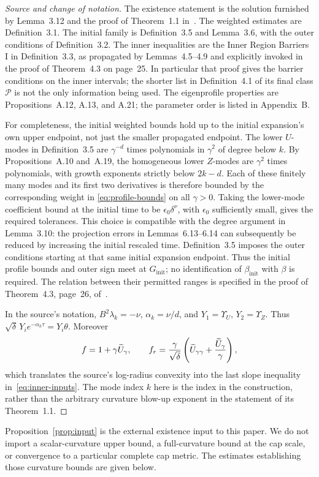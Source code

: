 \begin{proof}[Source and change of notation]
The existence statement is the solution furnished by Lemma~3.12 and the
proof of Theorem~1.1 in~\cite{Stolarski2019}. The weighted estimates are
Definition~3.1. The initial family is Definition~3.5 and Lemma~3.6,
with the outer conditions of Definition~3.2.
The inner inequalities are the Inner Region Barriers I in Definition~3.3,
as propagated by Lemmas~4.5--4.9 and explicitly invoked in the proof of
Theorem~4.3 on page~25. In particular that proof gives the barrier
conditions on the inner intervals; the shorter list in Definition~4.1
of its final class \(\mathcal P\) is not the only information being used.
The eigenprofile properties are Propositions~A.12, A.13, and A.21;
the parameter order is listed in Appendix~B.

For completeness, the initial weighted bounds hold up to the initial
expansion's own upper endpoint, not just the smaller propagated endpoint.
The lower \(U\)-modes in Definition~3.5 are \(\gamma^{-d}\) times
polynomials in \(\gamma^2\) of degree below \(k\).
By Propositions~A.10 and~A.19, the homogeneous lower \(Z\)-modes are
\(\gamma^2\) times polynomials, with growth exponents strictly below
\(2k-d\). Each of these finitely many modes and its first two
derivatives is therefore bounded by the corresponding weight in
\eqref{eq:profile-bounds} on all \(\gamma>0\).
Taking the lower-mode coefficient bound at the initial time to be
\(\epsilon_0\delta^\nu\), with \(\epsilon_0\) sufficiently small,
gives the required tolerances. This choice is compatible with the degree
argument in Lemma~3.10: the projection errors in Lemmas~6.13--6.14 can
subsequently be reduced by increasing the initial rescaled time.
Definition~3.5 imposes the outer conditions starting at that same initial
expansion endpoint. Thus the initial profile bounds and outer sign meet
at \(G_{\mathrm{init}}\); no identification of
\(\beta_{\mathrm{init}}\) with \(\beta\) is required.
The relation between their permitted ranges is specified in the proof
of Theorem~4.3, page~26, of~\cite{Stolarski2019}.

In the source's notation,
\(B^2\lambda_k=-\nu\), \(\alpha_k=\nu/d\), and
\(Y_1=\Upsilon_U\), \(Y_2=\Upsilon_Z\).
Thus \(\sqrt\delta\,Y_i e^{-\alpha_k\tau}=Y_i\theta\).
Moreover
\[
f=1+\gamma\widetilde U_\gamma,\qquad
f_r=\frac{\gamma}{\sqrt\delta}
   \left(\widetilde U_{\gamma\gamma}+\frac{\widetilde U_\gamma}{\gamma}\right),
\]
which translates the source's log-radius convexity into the last slope
inequality in~\eqref{eq:inner-inputs}.
The mode index \(k\) here is the index in the construction, rather than
the arbitrary curvature blow-up exponent in the statement of its
Theorem~1.1.
\end{proof}

\begin{remark}\label{rem:input-scope}
Proposition~\ref{prop:input} is the external existence input to this paper.
We do not import a scalar-curvature upper bound, a full-curvature bound at
the cap scale, or convergence to a particular complete cap metric.
The estimates establishing those curvature bounds are given below.
\end{remark}
